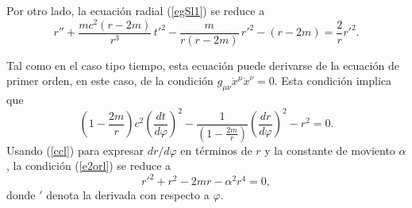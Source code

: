 Por otro lado, la ecuación radial (\ref{egSl1}) se reduce a
\begin{equation}
 r''+\frac{mc^2(r-2m)}{r^3}\,t'^2-\frac{m}{r\left(r-2m\right) }\,r'^2-(r-2m) =\frac{2}{r}r'^2. \label{ecr2l}
\end{equation}

Tal como en el caso tipo tiempo, esta ecuación puede derivarse de la ecuación de primer orden, en este caso, de la condición $g_{\mu\nu}\dot{x}^\mu\dot{x}^\nu=0$. Esta condición implica que
\begin{equation}
\left(1-\frac{2m}{r}\right)c^2\left(\frac{dt}{d\varphi}\right)^2-\frac{1}{\left(1-\frac{2m}{r}\right)}\left(\frac{dr}{d\varphi}\right)^2-r^2=0. \label{e2orl}
\end{equation}
Usando (\ref{ccl}) para expresar $dr/d\varphi$ en términos de $r$ y la constante de moviento $\alpha$, la condición (\ref{e2orl}) se reduce a
\begin{equation}\label{ecrpf}
 r'^2+r^2-2mr-\alpha^2r^4=0,
\end{equation}
donde $'$ denota la derivada con respecto a $\varphi$.

